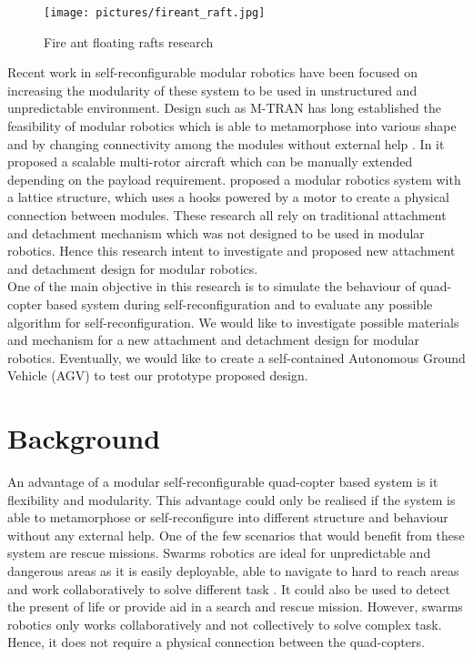 \documentclass[12pt,A4]{article}
\begin{document}
	\begin{figure}[h!]
		\centering
		\texttt{[image: pictures/fireant\_raft.jpg]}
		\caption{Fire ant floating rafts research}
	\end{figure}
	
	Recent work in self-reconfigurable modular robotics have been focused on increasing the modularity of these system to be used in unstructured and unpredictable environment. Design such as M-TRAN has long established the feasibility of modular robotics which is able to metamorphose into various shape and by changing connectivity among the modules without external help \citep{murata2002m-tran}. In \citep{duffy2015lift} it proposed a scalable multi-rotor aircraft which can be manually extended depending on the payload requirement. \citep{jorgensen2004modular} proposed a  modular robotics system with a lattice structure, which uses a hooks powered by a motor to create a physical connection between modules. These research all rely on traditional attachment and detachment mechanism which was not designed to be used in modular robotics. Hence this research intent to investigate and proposed new attachment and detachment design for modular robotics.\\
	
	One of the main objective in this research is to simulate the behaviour of quad-copter based system during self-reconfiguration and to evaluate any possible algorithm for self-reconfiguration. We would like to investigate possible materials and mechanism for a new attachment and detachment design for modular robotics. Eventually, we would like to create a self-contained Autonomous Ground Vehicle (AGV) to test our prototype proposed design.\\

	\section{Background}
	
	An advantage of a modular self-reconfigurable quad-copter based system is it flexibility and modularity. This advantage could only be realised if the system is able to metamorphose or self-reconfigure into different structure and behaviour without any external help. One of the few scenarios that would benefit from these system are rescue missions. Swarms robotics are ideal for unpredictable and dangerous areas as it is easily deployable, able to navigate to hard to reach areas and work collaboratively to solve different task \citep{stormont2005autonomous}. It could also be used to detect the present of life or provide aid in a search and rescue mission. However, swarms robotics only works collaboratively and not collectively to solve complex task. Hence, it does not require a physical connection between the quad-copters.\\
	
\end{document}
